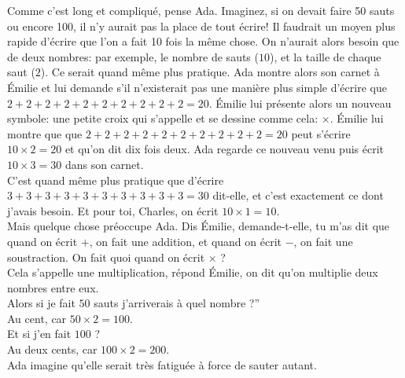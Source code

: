 Comme c’est long et compliqué, pense Ada. 
Imaginez, si on devait faire 50 sauts ou encore 100, il n’y aurait pas la place de tout écrire! 
Il faudrait un moyen plus rapide d’écrire que l’on a fait 10 fois la même chose. On n’aurait alors besoin que de deux nombres: par exemple, le nombre de sauts ($10$), et la taille de chaque saut ($2$). Ce serait quand même plus pratique. 
Ada montre alors son carnet à Émilie et lui demande s'il n’existerait pas une manière plus simple d’écrire que $2+2+2+2+2+2+2+2+2+2=20$. Émilie lui présente alors un nouveau symbole: une petite croix qui s’appelle  et se dessine comme cela: $\times$. Émilie lui montre que que $2+2+2+2+2+2+2+2+2+2=20$ peut s’écrire $10 \times 2 = 20$ et qu’on dit dix fois deux.
Ada regarde ce nouveau venu puis écrit $10 \times 3 = 30$ dans son carnet. 
\\
\guillemotleft C’est quand même plus pratique que d’écrire $3+3+3+3+3+3+3+3+3+3=30$ dit-elle, et c’est exactement ce dont j’avais besoin. Et pour toi, Charles, on écrit $10 \times 1 = 10$. \guillemotright\\
Mais quelque chose préoccupe Ada. 
\guillemotleft Dis Émilie, demande-t-elle, tu m’as dit que quand on écrit $+$, on fait une addition, et quand on écrit $-$, on fait une soustraction. On fait quoi quand on écrit $\times$ ?\\
\mdash Cela s’appelle une multiplication, répond Émilie, on dit qu’on multiplie deux nombres entre eux.\\
\mdash Alors si je fait $50$ sauts j’arriverais à quel nombre ?”\\
\mdash Au cent, car $50 \times 2 = 100$.\\
\mdash Et si j’en fait $100$ ?\\
\mdash Au deux cents, car $100 \times 2 = 200$. \guillemotright\\
Ada imagine qu'elle serait très fatiguée à force de sauter autant.
